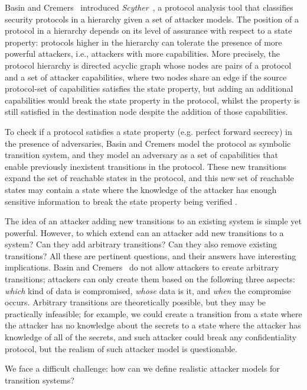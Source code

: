 Basin and Cremers~\cite{KnowYourEnemy} introduced \emph{Scyther}~\cite{Scyther}, a protocol analysis tool that classifies security protocols in a hierarchy given a set of attacker models. 
The position of a protocol in a hierarchy depends on its level of assurance with respect to a state property: protocols higher in the hierarchy can tolerate the presence of more powerful attackers, i.e., attackers with more capabilities. More precisely, the protocol hierarchy is directed acyclic graph whose nodes are pairs of a protocol and a set of attacker capabilities, where two nodes share an edge if the source protocol-set of capabilities satisfies the state property, but adding an additional capabilities would break the state property in the protocol, whilst the property is still satisfied in the destination node despite the addition of those capabilities.

To check if a protocol satisfies a state property (e.g. perfect forward secrecy) in the presence of adversaries, Basin and Cremers model the protocol as symbolic transition system, and they model an adversary as a set of capabilities that enable previously inexistent transitions in the protocol. These new transitions expand the set of reachable states in the protocol, and this new set of reachable states may contain a state where the knowledge of the attacker has enough sensitive information to break the state property being verified . 

The idea of an attacker adding new transitions to an existing system is simple yet powerful. However, to which extend can an attacker add new transitions to a system? Can they add arbitrary transitions? Can they also remove existing transitions? All these are pertinent questions, and their answers have interesting implications. Basin and Cremers~\cite{KnowYourEnemy} do not allow attackers to create arbitrary transitions; attackers can only create them based on the following three aspects: \emph{which} kind of data is compromised, \emph{whose} data is it, and \emph{when} the compromise occurs. Arbitrary transitions are theoretically possible, but they may be practically infeasible; for example, we could create a transition from a state where the attacker has no knowledge about the secrets to a state where the attacker has knowledge of all of the secrets, and such attacker could break any confidentiality protocol, but the realism of such attacker model is questionable. 

We face a difficult challenge: how can we define realistic attacker models for transition systems? 

